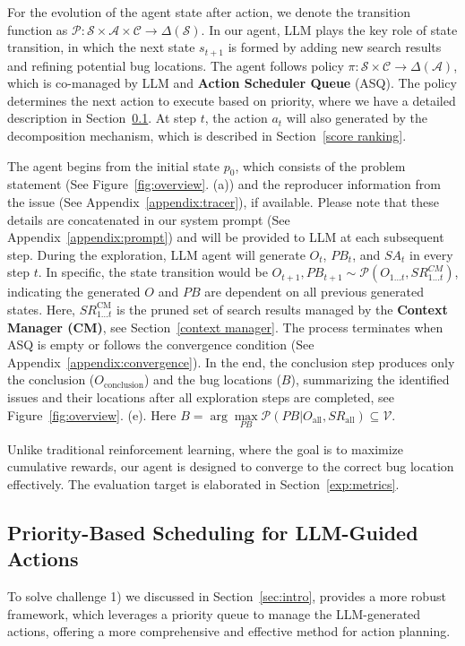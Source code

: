 For the evolution of the agent state after action, we denote the transition function as $\mathcal{P}:\mathcal{S}\times \mathcal{A}\times \mathcal{C} \to \Delta (\mathcal{S})$. In our agent, LLM plays the key role of state transition, in which the next state $s_{t+1}$ is formed by adding new search results and refining potential bug locations. The agent follows policy $\pi : \mathcal{S} \times \mathcal{C} \to \Delta(\mathcal{A})$, which is co-managed by LLM and \textbf{Action Scheduler Queue} (ASQ). The policy determines the next action to execute based on priority, where we have a detailed description in Section~\ref{scheduler queue}. At step $t$, the action $a_t$ will also generated by the decomposition mechanism, which is described in Section~\ref{score ranking}.

The agent begins from the initial state $p_0$, which consists of the problem statement (See Figure~\ref{fig:overview}. (a)) and the reproducer information from the issue (See Appendix~\ref{appendix:tracer}), if available. Please note that these details are concatenated in our system prompt (See Appendix~\ref{appendix:prompt}) and will be provided to LLM at each subsequent step. 
During the exploration, LLM agent will generate $O_t$, $PB_t$, and $SA_t$ in every step $t$. In specific, the state transition would be
$O_{t+1}, PB_{t+1} \sim \mathcal{P}(O_{1\dots t}, SR^{CM}_{1\dots t})$, indicating the generated $O$ and $PB$ are dependent on all previous generated states. Here, $SR^{\text{CM}}_{1 \dots t}$ is the pruned set of search results managed by the \textbf{Context Manager (CM)}, see Section~\ref{context manager}. The process terminates when ASQ is empty or follows the convergence condition (See Appendix~\ref{appendix:convergence}). 
In the end, the conclusion step produces only the conclusion ($O_{\text{conclusion}}$) and the bug locations ($B$), summarizing the identified issues and their locations after all exploration steps are completed, see Figure~\ref{fig:overview}. (e). Here $B=\arg\max\limits_{PB}\mathcal{P}(PB|O_{\text{all}},{SR}_{\text{all}}) \subseteq \mathcal{V}$.

Unlike traditional reinforcement learning, where the goal is to maximize cumulative rewards, our agent is designed to converge to the correct bug location effectively. The evaluation target is elaborated in Section~\ref{exp:metrics}.


\subsection{Priority-Based Scheduling for LLM-Guided Actions} \label{scheduler queue}
To solve challenge 1) we discussed in Section~\ref{sec:intro}, \nickname provides a more robust framework, which leverages a priority queue to manage the LLM-generated actions, offering a more comprehensive and effective method for action planning.


